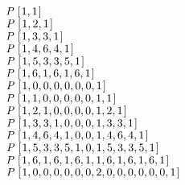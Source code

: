 \documentclass[tikz]{scrreprt}
\newcommand{\Conid}[1]{\mathit{#1}}
\begin{document}
\begin{minipage}{\textwidth}
\begin{center}
\ensuremath{\Conid{P}\;[\mskip1.5mu \mathrm{1},\mathrm{1}\mskip1.5mu]}\\
\ensuremath{\Conid{P}\;[\mskip1.5mu \mathrm{1},\mathrm{2},\mathrm{1}\mskip1.5mu]}\\
\ensuremath{\Conid{P}\;[\mskip1.5mu \mathrm{1},\mathrm{3},\mathrm{3},\mathrm{1}\mskip1.5mu]}\\
\ensuremath{\Conid{P}\;[\mskip1.5mu \mathrm{1},\mathrm{4},\mathrm{6},\mathrm{4},\mathrm{1}\mskip1.5mu]}\\
\ensuremath{\Conid{P}\;[\mskip1.5mu \mathrm{1},\mathrm{5},\mathrm{3},\mathrm{3},\mathrm{5},\mathrm{1}\mskip1.5mu]}\\
\ensuremath{\Conid{P}\;[\mskip1.5mu \mathrm{1},\mathrm{6},\mathrm{1},\mathrm{6},\mathrm{1},\mathrm{6},\mathrm{1}\mskip1.5mu]}\\
\ensuremath{\Conid{P}\;[\mskip1.5mu \mathrm{1},\mathrm{0},\mathrm{0},\mathrm{0},\mathrm{0},\mathrm{0},\mathrm{0},\mathrm{1}\mskip1.5mu]}\\
\ensuremath{\Conid{P}\;[\mskip1.5mu \mathrm{1},\mathrm{1},\mathrm{0},\mathrm{0},\mathrm{0},\mathrm{0},\mathrm{0},\mathrm{1},\mathrm{1}\mskip1.5mu]}\\
\ensuremath{\Conid{P}\;[\mskip1.5mu \mathrm{1},\mathrm{2},\mathrm{1},\mathrm{0},\mathrm{0},\mathrm{0},\mathrm{0},\mathrm{1},\mathrm{2},\mathrm{1}\mskip1.5mu]}\\
\ensuremath{\Conid{P}\;[\mskip1.5mu \mathrm{1},\mathrm{3},\mathrm{3},\mathrm{1},\mathrm{0},\mathrm{0},\mathrm{0},\mathrm{1},\mathrm{3},\mathrm{3},\mathrm{1}\mskip1.5mu]}\\
\ensuremath{\Conid{P}\;[\mskip1.5mu \mathrm{1},\mathrm{4},\mathrm{6},\mathrm{4},\mathrm{1},\mathrm{0},\mathrm{0},\mathrm{1},\mathrm{4},\mathrm{6},\mathrm{4},\mathrm{1}\mskip1.5mu]}\\
\ensuremath{\Conid{P}\;[\mskip1.5mu \mathrm{1},\mathrm{5},\mathrm{3},\mathrm{3},\mathrm{5},\mathrm{1},\mathrm{0},\mathrm{1},\mathrm{5},\mathrm{3},\mathrm{3},\mathrm{5},\mathrm{1}\mskip1.5mu]}\\
\ensuremath{\Conid{P}\;[\mskip1.5mu \mathrm{1},\mathrm{6},\mathrm{1},\mathrm{6},\mathrm{1},\mathrm{6},\mathrm{1},\mathrm{1},\mathrm{6},\mathrm{1},\mathrm{6},\mathrm{1},\mathrm{6},\mathrm{1}\mskip1.5mu]}\\
\ensuremath{\Conid{P}\;[\mskip1.5mu \mathrm{1},\mathrm{0},\mathrm{0},\mathrm{0},\mathrm{0},\mathrm{0},\mathrm{0},\mathrm{2},\mathrm{0},\mathrm{0},\mathrm{0},\mathrm{0},\mathrm{0},\mathrm{0},\mathrm{1}\mskip1.5mu]}
\end{center}
\end{minipage}
\end{document}
